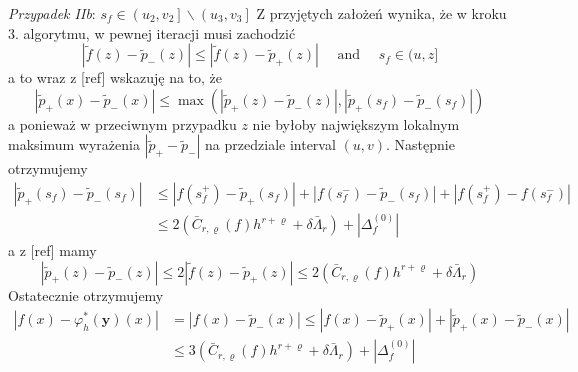 \documentclass[oik, pdftex, robocza, man]{mgrwms}
\begin{document}
    \textit{Przypadek IIb}: $s_{f} \in\left(u_{2}, v_{2}\right] \backslash\left(u_{3}, v_{3}\right]$
    Z przyjętych założeń wynika, że w kroku 3. algorytmu, w pewnej iteracji musi zachodzić
    \begin{equation*}
        \left|\tilde{f}(z)-\tilde{p}_{-}(z)\right| \leq\left|\tilde{f}(z)-\tilde{p}_{+}(z)\right| \quad \text { and } \quad s_{f} \in(u, z]        
    \end{equation*}
    a to wraz z [ref] wskazuję na to, że
    \begin{equation*}
        \left|\tilde{p}_{+}(x)-\tilde{p}_{-}(x)\right| \leq \max \left(\left|\tilde{p}_{+}(z)-\tilde{p}_{-}(z)\right|,\left|\tilde{p}_{+}\left(s_{f}\right)-\tilde{p}_{-}\left(s_{f}\right)\right|\right)        
    \end{equation*}
    a ponieważ  w przeciwnym przypadku $z$ nie byłoby największym lokalnym maksimum wyrażenia $\left|\tilde{p}_{+}-\tilde{p}_{-}\right|$ na przedziale interval $(u, v)$. Następnie otrzymujemy
    \begin{equation*}
        \begin{aligned}
            \left|\tilde{p}_{+}\left(s_{f}\right)-\tilde{p}_{-}\left(s_{f}\right)\right| & \leq\left|f\left(s_{f}^{+}\right)-\tilde{p}_{+}\left(s_{f}\right)\right|+\left|f\left(s_{f}^{-}\right)-\tilde{p}_{-}\left(s_{f}\right)\right|+\left|f\left(s_{f}^{+}\right)-f\left(s_{f}^{-}\right)\right| \\
            & \leq 2\left(\bar{C}_{r, \varrho}(f) h^{r+\varrho}+\delta \bar{\Lambda}_{r}\right)+\left|\Delta_{f}^{(0)}\right|
        \end{aligned}
    \end{equation*}
    a z [ref] mamy
    \begin{equation*}
        \left|\tilde{p}_{+}(z)-\tilde{p}_{-}(z)\right| \leq 2\left|\tilde{f}(z)-\tilde{p}_{+}(z)\right| \leq 2\left(\bar{C}_{r, \varrho}(f) h^{r+\varrho}+\delta \bar{\Lambda}_{r}\right)
    \end{equation*}
    Ostatecznie otrzymujemy
    \begin{equation*}
        \begin{aligned}
            \left|f(x)-\varphi_{h}^{*}(\mathbf{y})(x)\right| &=\left|f(x)-\tilde{p}_{-}(x)\right| \leq\left|f(x)-\tilde{p}_{+}(x)\right|+\left|\tilde{p}_{+}(x)-\tilde{p}_{-}(x)\right| \\
            & \leq 3\left(\bar{C}_{r, \varrho}(f) h^{r+\varrho}+\delta \bar{\Lambda}_{r}\right)+\left|\Delta_{f}^{(0)}\right|
        \end{aligned}
    \end{equation*}
    
\end{document}
